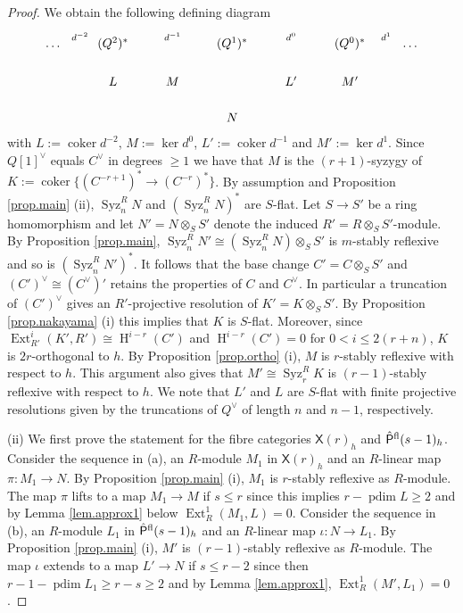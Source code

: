 \documentclass[a4paper,10pt]{amsart}
\theoremstyle{plain}
\theoremstyle{definition}
\theoremstyle{remark}
\numberwithin{equation}{xx}
\DeclareMathOperator{\coker}{coker}
\DeclareMathOperator{\Ext}{Ext}
\DeclareMathOperator{\cH}{H}
\DeclareMathOperator{\pdim}{pdim}
\DeclareMathOperator{\Syz}{Syz}
\newcommand{\co}{\colon}
\newcommand{\ra}{\rightarrow}
\newcommand{\ot}{{\otimes}}
\newcommand{\Pf}{\hat{\cat{P}}{}^{\textnormal{fl}}}
\renewcommand{\geq}{\geqslant}
\renewcommand{\leq}{\leqslant}
\newcommand{\cat}[1]{\mathsf{{#1}}}
\newcommand{\xt}[4]{{\Ext} _{#2}^{#1}({#3},{#4})}
\newcommand{\syz}[2]{{\Syz}_{#2}^{#1}}
\begin{document}
\begin{proof}
We obtain the following defining diagram
\begin{equation}
\xymatrix@C-0pt@R-8pt@H-30pt{
\dots \ar[r]^(0.45){d^{-2}} & (Q^{2})^{*} \ar[rr]^{d^{-1}} \ar[d] && (Q^{1})^{*} \ar[rr]^{d^{0}} \ar[dr] && (Q^{0})^{*} \ar[r]^(0.6){d^{1}} & \dots  \\
& L \ar[r] & M \ar[ur] \ar[dr] && L' \ar[r] & M' \ar[u] \\
&&& N \ar[ur]
}
\end{equation}
with \(L:=\coker d^{-2}\), \(M:=\ker d^{0}\), \(L':=\coker d^{-1}\) and \(M':=\ker d^{1}\).
Since \(Q[1]^{\vee}\) equals \(C^{\vee}\) in degrees \(\geq 1\) we have that \(M\) is the \((r+1)\)-syzygy of \(K:=\coker\{(C^{-r+1})^{*}\ra (C^{-r})^{*}\}\). By assumption and Proposition \ref{prop.main} (ii), \(\syz{R}{n}N\) and \((\syz{R}{n}N)^{*}\) are \(S\)-flat. Let \(S\ra S'\) be a ring homomorphism and let \(N'=N\ot_{S} S'\) denote the induced \(R'=R\ot_{S}S'\)-module. By Proposition \ref{prop.main}, \(\syz{R}{n}N'\cong(\syz{R}{n}N)\ot_{S}S'\) is \(m\)-stably reflexive and so is \((\syz{R}{n}N')^{*}\). It follows that the base change \(C'=C\ot_{S}S'\) and \((C')^{\vee}\cong (C^{\vee})'\) retains the properties of \(C\) and \(C^{\vee}\). In particular a truncation of \((C')^{\vee}\) gives an \(R'\)-projective resolution of \(K'=K\ot_{S}S'\). By Proposition \ref{prop.nakayama} (i) this implies that \(K\) is \(S\)-flat. Moreover, since \(\xt{i}{R'}{K'}{R'}\cong\cH^{i-r}(C')\) and \(\cH^{i-r}(C')=0\) for \(0<i\leq 2(r+n)\), \(K\) is \(2r\)-orthogonal to \(h\). By Proposition \ref{prop.ortho} (i), \(M\) is \(r\)-stably reflexive with respect to \(h\). This argument also gives that \(M'\cong \syz{R}{r}K\) is \((r-1)\)-stably reflexive with respect to \(h\). We note that \(L'\) and \(L\) are \(S\)-flat with finite projective resolutions given by the truncations of \(Q^{\vee}\) of length \(n\) and \(n-1\), respectively.

(ii) We first prove the statement for the fibre categories \(\cat{X}(r)_{h}\) and \(\Pf(s-1)_{h}\). Consider the sequence in (a), an \(R\)-module \(M_{1}\) in \(\cat{X}(r)_{h}\) and an \(R\)-linear map \(\pi\co M_{1}\ra N\). By Proposition \ref{prop.main} (i), \(M_{1}\) is \(r\)-stably reflexive as \(R\)-module. The map \(\pi\) lifts to a map \(M_{1}\ra M\) if \(s\leq r\) since this implies \(r-\pdim L\geq 2\) and by Lemma \ref{lem.approx1} below \(\xt{1}{R}{M_{1}}{L}=0\). Consider the sequence in (b), an \(R\)-module \(L_{1}\) in \(\Pf(s-1)_{h}\) and an \(R\)-linear map \(\iota\co N\ra L_{1}\). By Proposition \ref{prop.main} (i), \(M'\) is \((r-1)\)-stably reflexive as \(R\)-module. The map \(\iota\) extends to a map \(L'\ra N\) if \(s\leq r-2\) since then \(r-1-\pdim L_{1}\geq r-s\geq 2\) and by Lemma \ref{lem.approx1}, \(\xt{1}{R}{M'}{L_{1}}=0\).


\end{proof}
\end{document}
